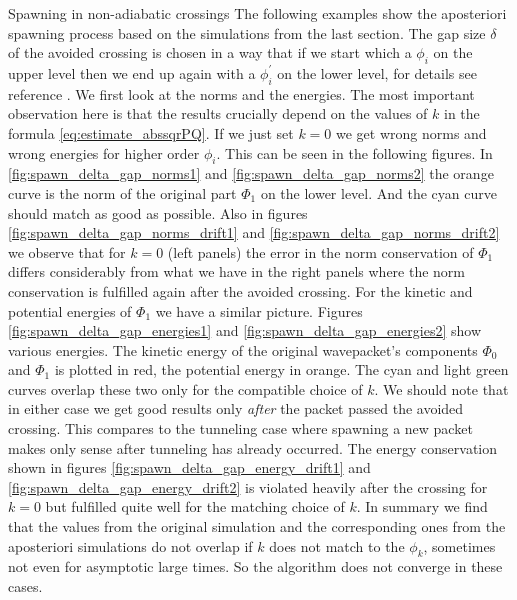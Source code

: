 \begin{chapter}{Spawning in non-adiabatic crossings}
The following examples show the aposteriori spawning process based on the simulations
from the last section. The gap size $\delta$ of the avoided crossing is chosen in
a way that if we start which a $\phi_i$ on the upper level then we end up again
with a $\phi^\prime_i$ on the lower level, for details see reference \cite{BGH_nonadibatic_algorithms}.
We first look at the norms and the energies. The most important observation here is that
the results crucially depend on the values of $k$ in the formula \eqref{eq:estimate_abssqrPQ}.
If we just set $k=0$ we get wrong norms and wrong energies for higher order
$\phi_i$. This can be seen in the following figures. In \ref{fig:spawn_delta_gap_norms1}
and \ref{fig:spawn_delta_gap_norms2} the orange curve is the norm of the original
part $\Phi_1$ on the lower level. And the cyan curve should match as good as possible.
Also in figures \ref{fig:spawn_delta_gap_norms_drift1} and \ref{fig:spawn_delta_gap_norms_drift2}
we observe that for $k=0$ (left panels) the error in the norm conservation of
$\Phi_1$ differs considerably from what we have in the right panels where
the norm conservation is fulfilled again after the avoided crossing.
For the kinetic and potential energies of $\Phi_1$ we have a similar picture.
Figures \ref{fig:spawn_delta_gap_energies1} and \ref{fig:spawn_delta_gap_energies2}
show various energies. The kinetic energy of the original wavepacket's components
$\Phi_0$ and $\Phi_1$ is plotted in red, the potential energy in orange. The cyan
and light green curves overlap these two only for the compatible choice of $k$.
We should note that in either case we get good results only \emph{after} the
packet passed the avoided crossing. This compares to the tunneling case where
spawning a new packet makes only sense after tunneling has already occurred.
The energy conservation shown in figures \ref{fig:spawn_delta_gap_energy_drift1}
and \ref{fig:spawn_delta_gap_energy_drift2} is violated heavily after the crossing
for $k=0$ but fulfilled quite well for the matching choice of $k$.
In summary we find that the values from the original simulation and the
corresponding ones from the aposteriori simulations do not overlap if $k$
does not match to the $\phi_k$, sometimes not even for asymptotic large
times. So the algorithm does not converge in these cases.



\end{chapter}
